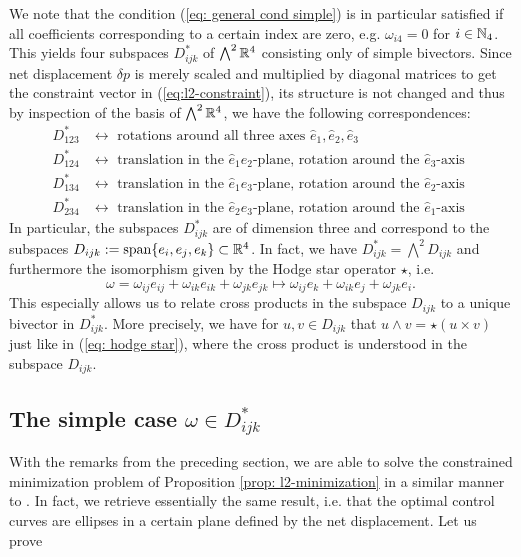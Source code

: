 We note that the condition (\ref{eq: general cond simple}) is in particular satisfied if all coefficients corresponding to a certain index are zero, e.g. $\omega_{i4} = 0$ for $i \in \mathbb{N}_4$. This yields four subspaces $D^*_{ijk}$ of $\bigwedge^2 \mathbb{R}^4$ consisting only of simple bivectors. Since net displacement $\delta p$ is merely scaled and multiplied by diagonal matrices to get the constraint vector in (\ref{eq:l2-constraint}), its structure is not changed and thus by inspection of the basis of $\bigwedge^2 \mathbb{R}^4$, we have the following correspondences:
\begin{align*}
D^{*}_{123} &\longleftrightarrow\text{ rotations around all three axes } \hat{e}_1, \hat{e}_2, \hat{e}_3\\
D^{*}_{124} &\longleftrightarrow \text{ translation in the $\hat{e}_1\hat{e}_2$-plane, rotation around the $\hat{e}_3$-axis }\\
D^{*}_{134} &\longleftrightarrow  \text{ translation in the $\hat{e}_1\hat{e}_3$-plane, rotation around the $\hat{e}_2$-axis }\\
D^{*}_{234} &\longleftrightarrow  \text{ translation in the $\hat{e}_2\hat{e}_3$-plane, rotation around the $\hat{e}_1$-axis }
\end{align*}
In particular, the subspaces $D^{*}_{ijk}$ are of dimension three and correspond to the subspaces $D_{ijk} := \operatorname{span}\{e_i, e_j, e_k\} \subset \mathbb{R}^4$. In fact, we have $D^{*}_{ijk} = \bigwedge^2 D_{ijk}$ and furthermore the isomorphism given by the Hodge star operator $\star$, i.e.
\begin{equation}
\omega = \omega_{ij} e_{ij} + \omega_{ik} e_{ik} + \omega_{jk} e_{jk} \mapsto \omega_{ij} e_k + \omega_{ik} e_j + \omega_{jk} e_i.
\end{equation}
This especially allows us to relate cross products in the subspace $D_{ijk}$ to a unique bivector in $D_{ijk}^*$. More precisely, we have for $u, v \in D_{ijk}$ that $u \wedge v = \star(u \times v)$ just like in (\ref{eq: hodge star}), where the cross product is understood in the subspace $D_{ijk}$.

\subsection[The simple case]{The simple case $\omega \in D_{ijk}^*$}
With the remarks from the preceding section, we are able to solve the constrained minimization problem of Proposition \ref{prop: l2-minimization} in a similar manner to \cite{Alouges2017}. In fact, we retrieve essentially the same result, i.e. that the optimal control curves are ellipses in a certain plane defined by the net displacement. Let us prove

